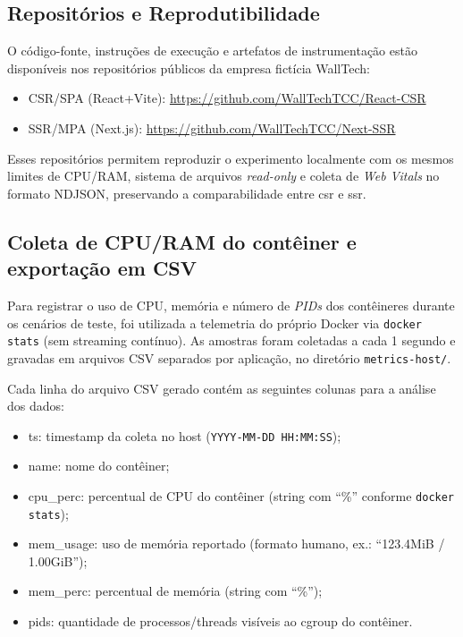 \subsection{Repositórios e Reprodutibilidade}
\label{ssec:repositorios-repro}
O código-fonte, instruções de execução e artefatos de instrumentação estão disponíveis nos repositórios públicos da empresa fictícia WallTech:
\begin{itemize}
  \item CSR/SPA (React+Vite): \url{https://github.com/WallTechTCC/React-CSR}
  \item SSR/MPA (Next.js): \url{https://github.com/WallTechTCC/Next-SSR}
\end{itemize}
Esses repositórios permitem reproduzir o experimento localmente com os mesmos limites de CPU/RAM, sistema de arquivos \textit{read-only} e coleta de \textit{Web Vitals} no formato NDJSON, preservando a comparabilidade entre \acrshort{csr} e \acrshort{ssr}.


\subsection{Coleta de CPU/RAM do contêiner e exportação em CSV}
\label{ssec:coleta-host-docker-stats}

Para registrar o uso de CPU, memória e número de \textit{PIDs} dos contêineres durante os cenários de teste, foi utilizada a telemetria do próprio Docker via \texttt{docker stats} (sem streaming contínuo). As amostras foram coletadas a cada 1 segundo e gravadas em arquivos CSV separados por aplicação, no diretório \texttt{metrics-host/}.

Cada linha do arquivo CSV gerado contém as seguintes colunas para a análise dos dados:
\begin{itemize}
  \item ts: timestamp da coleta no host (\texttt{YYYY-MM-DD HH:MM:SS});
  \item name: nome do contêiner;
  \item cpu\_perc: percentual de CPU do contêiner (string com ``\%'' conforme \texttt{docker stats});
  \item mem\_usage: uso de memória reportado (formato humano, ex.: ``123.4MiB / 1.00GiB'');
  \item mem\_perc: percentual de memória (string com ``\%'');
  \item pids: quantidade de processos/threads visíveis ao cgroup do contêiner.
\end{itemize}


